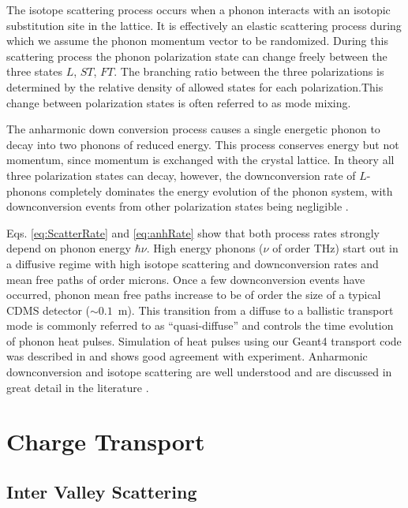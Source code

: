 \documentclass[preprint,12pt]{elsarticle}
\begin{document}
The isotope scattering process occurs when a phonon interacts with an isotopic substitution site in the lattice. It is effectively an elastic scattering process during which we assume the phonon momentum vector to be randomized. During this scattering process the phonon polarization state can change freely between the three states $L$, $ST$, $FT$. The branching ratio between the three polarizations is determined by the relative density of allowed states for each polarization.This change between polarization states is often referred to as mode mixing.

The anharmonic down conversion process causes a single energetic phonon to decay into two phonons of reduced energy. This process conserves energy but not momentum, since momentum is exchanged with the crystal lattice. In theory all three polarization states can decay, however, the downconversion rate of $L$-phonons completely dominates the energy evolution of the phonon system, with downconversion events from other polarization states being negligible \cite{Tamura2}.


Eqs. \ref{eq:ScatterRate} and \ref{eq:anhRate} show that both process rates strongly depend on phonon energy $\hbar \nu$. High energy phonons ($\nu$ of order THz) start out in a diffusive regime with high isotope scattering and downconversion rates and mean free paths of order microns. Once a few downconversion events have occurred, phonon mean free paths increase to be of order the size of a typical CDMS detector ($\sim0.1$~m). This transition from a diffuse to a ballistic transport mode is commonly referred to as ``quasi-diffuse'' and controls the time evolution of phonon heat pulses. Simulation of heat pulses using our Geant4 transport code was described in \cite{Brandt} and shows good agreement with experiment. Anharmonic downconversion and isotope scattering are well understood and are discussed in great detail in the literature \cite{Tamura1}\cite{Tamura2}\cite{Wolfe}\cite{Tamura3}.




\section{Charge Transport}
\label{sec:ChargeTransport}



\subsection{Inter Valley Scattering}
\label{sec:InterValley}
\end{document}
